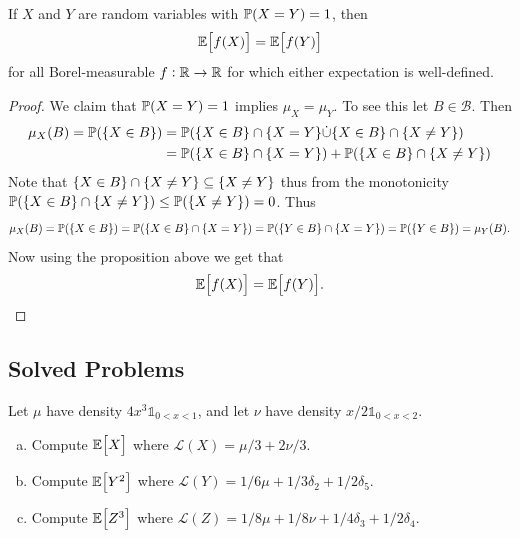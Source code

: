 \begin{corollary}
	If $ X $ and $ Y $ are random variables with $ \mathbb{P}(X=Y) = 1 $, then \[ \mathbb{E}\big[f(X)\big] = \mathbb{E}\big[f(Y)\big] \]
	for all Borel-measurable $ f:\mathbb{R} \to \mathbb{R} $ for which either expectation is well-defined. 
\end{corollary}
\begin{proof}
	We claim that $ \mathbb{P}(X=Y) = 1 $ implies $ \mu_X = \mu_Y $. To see this let $ B \in \mathcal{B} $. Then
	\begin{align*}
		\mu_X (B) = \mathbb{P}(\{X\in B\}) &= \mathbb{P}(\{X\in B\}\cap\{X=Y\} \dot{\cup} \{X\in B\}\cap \{X\neq Y\}) \\
		&=\mathbb{P}(\{X\in B\}\cap\{X=Y\}) + \mathbb{P}(\{X\in B\}\cap \{X\neq Y\})
	\end{align*}
	Note that $ \{X\in B\}\cap \{X \neq Y\} \subseteq \{X \neq Y\} $ thus from the monotonicity $ \mathbb{P}(\{X\in B\}\cap \{X \neq Y\}) \leq \mathbb{P}(\{X\neq Y\}) = 0 $. Thus
	\[ \mu_X (B) = \mathbb{P}(\{X\in B\}) = \mathbb{P}(\{X\in B\}\cap\{X=Y\}) = \mathbb{P}(\{Y\in B\}\cap\{X=Y\}) = \mathbb{P}(\{Y\in B\}) = \mu_Y(B). \]
	Now using the proposition above we get that
	\[ \mathbb{E}\big[f(X)\big] = \mathbb{E}\big[f(Y)\big]. \]
\end{proof}


\subsection{Solved Problems}
\begin{problem}
	Let $ \mu $ have density $ 4x^3\mathds{1}_{0<x<1} $, and let $ \nu $ have density $ x/2\mathds{1}_{0<x<2} $.
	\begin{enumerate}[(a)]
		\item Compute $ \mathbb{E}\big[X\big] $ where $ \mathcal{L}(X) = \mu/3 + 2\nu/3 $.
		\item Compute $ \mathbb{E}\big[Y^2\big] $ where $ \mathcal{L}(Y) = 1/6\mu + 1/3\delta_2 + 1/2\delta_5 $.
		\item Compute $ \mathbb{E}\big[Z^3\big] $ where $ \mathcal{L}(Z) = 1/8\mu+1/8\nu + 1/4\delta_3 + 1/2\delta_4 $.
	\end{enumerate}
\end{problem}

